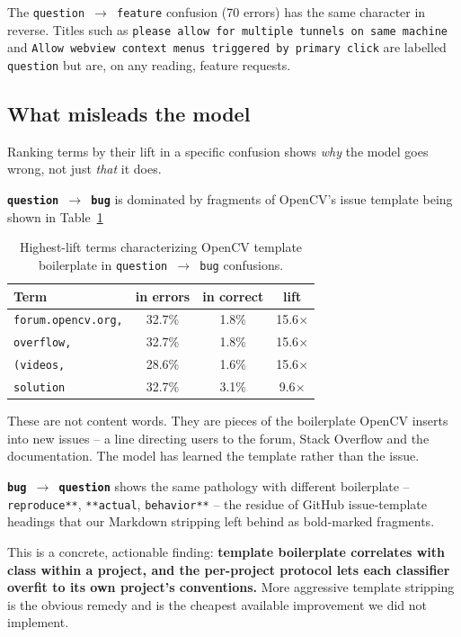 The \texttt{question $\rightarrow$ feature} confusion (70 errors) has the same character in reverse. Titles such as \texttt{please allow for multiple tunnels on same machine} and \texttt{Allow webview context menus triggered by primary click} are labelled \texttt{question} but are, on any reading, feature requests.

\subsection{What misleads the model}

Ranking terms by their lift in a specific confusion shows \textit{why} the model goes wrong, not just \textit{that} it does.

\textbf{\texttt{question $\rightarrow$ bug}} is dominated by fragments of OpenCV's issue template being shown in Table~\ref{tab:boilerplate_lift_terms}

\begin{table}[H]
\centering
\caption{Highest-lift terms characterizing OpenCV template boilerplate in \texttt{question $\rightarrow$ bug} confusions.}
\label{tab:boilerplate_lift_terms}
\vspace{0.5em}
\begin{tabular}{l c c c}
\hline
Term & in errors & in correct & lift \\
\hline
\texttt{forum.opencv.org,} & 32.7\% & 1.8\% & 15.6$\times$ \\
\texttt{overflow,} & 32.7\% & 1.8\% & 15.6$\times$ \\
\texttt{(videos,} & 28.6\% & 1.6\% & 15.6$\times$ \\
\texttt{solution} & 32.7\% & 3.1\% & 9.6$\times$ \\
\hline
\end{tabular}
\end{table}

These are not content words. They are pieces of the boilerplate OpenCV inserts into new issues -- a line directing users to the forum, Stack Overflow and the documentation. The model has learned the template rather than the issue.

\textbf{\texttt{bug $\rightarrow$ question}} shows the same pathology with different boilerplate -- \texttt{reproduce**}, \texttt{**actual}, \texttt{behavior**} -- the residue of GitHub issue-template headings that our Markdown stripping left behind as bold-marked fragments.

This is a concrete, actionable finding: \textbf{template boilerplate correlates with class within a project, and the per-project protocol lets each classifier overfit to its own project's conventions.} More aggressive template stripping is the obvious remedy and is the cheapest available improvement we did not implement.


